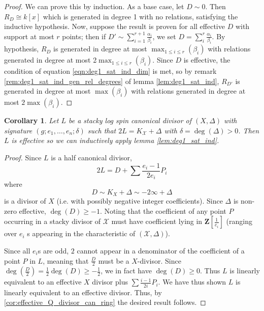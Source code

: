 \documentclass{amsart}
\theoremstyle{plain}
\newtheorem{cor}[thm]{Corollary}
\theoremstyle{definition}
\theoremstyle{remark}
\numberwithin{equation}{section}
\newcommand \sx{\mathscr X}
\newcommand \subhalf[1]{\frac{{#1} - 1}{2{#1}}}
\newcommand \halfcan{L}
\begin{document}
\begin{proof}
We can prove this by induction.  As a base case, let $D\sim 0$.  Then $R_D\cong k[x]$ which is generated in degree 1 with no relations, satisfying the inductive hypothesis.
Now, suppose the result is proven for all effective $D$ with support at most $r$ points; then if $D'\sim \sum_{i=1}^{r+1} \frac{\alpha_i}{\beta_i}$, we set $D=\sum_i^{r} \frac{\alpha_i}{\beta_i}$.  By hypothesis, $R_D$ is generated in degree at most $\max_{1\le i\le r}(\beta_i)$ with relations generated in degree at most 2$\max_{1\le i\le r}(\beta_i)$.  Since $D$ is effective, the condition of equation \ref{eqn:deg1_sat_ind_dim} is met, so by remark \ref{rem:deg1_sat_ind_gen_rel_degrees} of lemma \ref{lem:deg1_sat_ind}, $R_{D'}$ is generated in degree at most $\max(\beta_i)$ with relations generated in degree at most $2\max(\beta_i)$.
\end{proof}


\begin{cor}\label{cor:genus_0_posiive_delta}
Let $\halfcan$ be a stacky log spin canonical divisor of $(X,\Delta)$ with signature $(g;e_1,\ldots, e_n;\delta)$ such that $2\halfcan=K_\sx+\Delta$ with $\delta=\deg(\Delta)>0$.  Then $\halfcan$ is effective so we can inductively apply lemma \ref{lem:deg1_sat_ind}.
\end{cor}
\begin{proof}
Since $\halfcan$ is a half canonical divisor, 
\[
	2\halfcan=D+\sum \subhalf{e_i}P_i
\] 
where 
\[
	D\sim K_X+\Delta\sim -2\infty+ \Delta
\] is a divisor of $X$ (i.e. with 
possibly negative integer coefficients).  Since $\Delta$ is non-
zero effective, $\deg(D)\ge -1$.   Noting that the coefficient of 
any point $P$ occurring in a stacky divisor of $\sx$ must have 
coefficient lying in $\mathbf{Z}[\frac{1}{e_i}]$ (ranging over $e_i$
s appearing in the characteristic of $(\sx,\Delta)$).
 
Since all $e_i$s are odd, $2$ cannot appear in a denominator of the 
coefficient of a point $P$ in $\halfcan$, meaning that $\frac{D}{2}$
 must be a $X$-divisor.  Since $\deg(\frac{D}{2})=\frac{1}{2}\deg(D)
\ge -\frac{1}{2}$, we in fact have $\deg(D)\ge 0$.  Thus $\halfcan$ 
is linearly equivalent to an effective $X$ divisor plus $\sum 
\subhalf{i}P_i$.  We have thus shown $\halfcan$ is linearly equivalent to an effective divisor.  Thus, by \ref{cor:effective_Q_divisor_can_ring} the desired result follows.
\end{proof}
\end{document}
